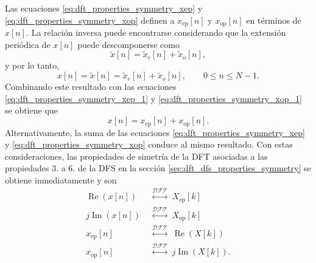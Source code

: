 \documentclass[a4paper]{report}
\renewcommand{\Re}{\operatorname{Re}}
\renewcommand{\Im}{\operatorname{Im}}
\begin{document}
Las ecuaciones \ref{eq:dft_properties_symmetry_xep} y \ref{eq:dft_properties_symmetry_xop} definen a \(x_\textrm{ep}[n]\) y \(x_\textrm{op}[n]\) en términos de \(x[n]\). La relación inversa puede encontrarse considerando que la extensión periódica de \(x[n]\) puede descomponerse como
\[
 \tilde{x}[n]=\tilde{x}_e[n]+\tilde{x}_o[n],
\]
y por lo tanto,
\[
 x[n]=\tilde{x}[n]=\tilde{x}_e[n]+\tilde{x}_o[n],\qquad 0\leq n\leq N-1.
\]
Combinando este resultado con las ecuaciones \ref{eq:dft_properties_symmetry_xep_1} y \ref{eq:dft_properties_symmetry_xop_1} se obtiene que 
\[
 x[n]=x_\textrm{ep}[n]+x_\textrm{op}[n].
\]
Alternativamente, la suma de las ecuaciones \ref{eq:dft_properties_symmetry_xep} y \ref{eq:dft_properties_symmetry_xop} conduce al mismo resultado. Con estas consideraciones, las propiedades de simetría de la DFT asociadas a las propiedades 3. a 6. de la DFS en la sección \ref{sec:dft_dfs_properties_symmetry} se obtiene inmediatamente y son
\begin{align*}
 \Re(x[n])&\;\overset{\mathcal{DFT}}{\longleftrightarrow}\;X_\textrm{ep}[k]\\
 j\Im(x[n])&\;\overset{\mathcal{DFT}}{\longleftrightarrow}\;X_\textrm{op}[k]\\
 x_\textrm{ep}[n]&\;\overset{\mathcal{DFT}}{\longleftrightarrow}\;\Re(X[k])\\
 x_\textrm{op}[n]&\;\overset{\mathcal{DFT}}{\longleftrightarrow}\;j\Im(X[k]).
\end{align*}
\end{document}
